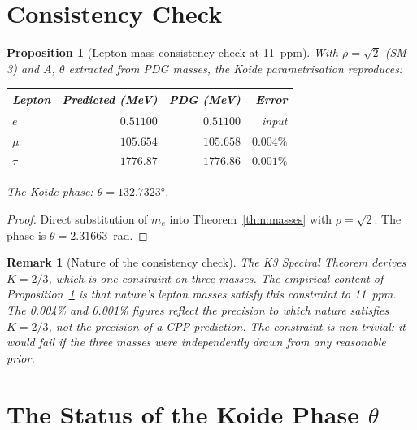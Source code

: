 \documentclass[11pt]{article}
\newtheorem{proposition}[theorem]{Proposition}
\newtheorem{remark}{Remark}[section]
\begin{document}
\section{Consistency Check}

\begin{proposition}[Lepton mass consistency check at 11~ppm]
\label{prop:predictions}
With $\rho = \sqrt{2}$ (SM-3) and $A$, $\theta$ extracted from PDG masses,
the Koide parametrisation reproduces:
\begin{center}
\renewcommand{\arraystretch}{1.3}
\begin{tabular}{lrrr}
\toprule
Lepton & Predicted (MeV) & PDG (MeV) & Error \\
\midrule
$e$ & $0.51100$ & $0.51100$ & input \\
$\mu$ & $105.654$ & $105.658$ & $0.004\%$ \\
$\tau$ & $1776.87$ & $1776.86$ & $0.001\%$ \\
\bottomrule
\end{tabular}
\end{center}
The Koide phase: $\theta = 132.7323°$.
\end{proposition}

\begin{proof}
Direct substitution of $m_e$ into Theorem~\ref{thm:masses}
with $\rho = \sqrt{2}$.  The phase is $\theta = 2.31663$~rad.
\end{proof}

\begin{remark}[Nature of the consistency check]
The K3 Spectral Theorem derives $K = 2/3$, which is one constraint on
three masses.  The empirical content of Proposition~\ref{prop:predictions}
is that nature's lepton masses satisfy this constraint to 11~ppm.
The 0.004\% and 0.001\% figures reflect the precision to which nature
satisfies $K = 2/3$, not the precision of a CPP prediction.
The constraint is non-trivial: it would fail if the three masses were
independently drawn from any reasonable prior.
\end{remark}

\section{The Status of the Koide Phase $\theta$}
\label{sec:theta}
\end{document}
